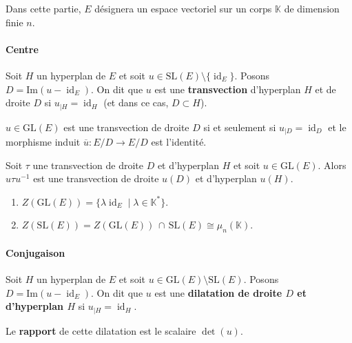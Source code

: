 	Dans cette partie, $E$ désignera un espace vectoriel sur un corps $\mathbb{K}$ de dimension finie $n$.

	\paragraph{Centre}


	\begin{definition}
		Soit $H$ un hyperplan de $E$ et soit $u \in \mathrm{SL}(E) \setminus \{ \operatorname{id}_E \}$. Posons $D = \mathrm{Im}(u - \operatorname{id}_E)$. On dit que $u$ est une \textbf{transvection} d'hyperplan $H$ et de droite $D$ si $u_{|H} = \operatorname{id}_H$ (et dans ce cas, $D \subset H$).
	\end{definition}

	\begin{proposition}
		$u \in \mathrm{GL}(E)$ est une transvection de droite $D$ si et seulement si $u_{|D} = \operatorname{id}_D$ et le morphisme induit $\overline{u} : E/D \rightarrow E/D$ est l'identité.
	\end{proposition}

	\begin{proposition}
		Soit $\tau$ une transvection de droite $D$ et d'hyperplan $H$ et soit $u \in \mathrm{GL}(E)$. Alors $u \tau u^{-1}$ est une transvection de droite $u(D)$ et d'hyperplan $u(H)$.
	\end{proposition}

	\begin{corollary}
		\begin{enumerate}[label=(\roman*)]
			\item $Z(\mathrm{GL}(E)) = \{ \lambda \operatorname{id}_E \mid \lambda \in \mathbb{K}^* \}$.
			\item $Z(\mathrm{SL}(E)) = Z(\mathrm{GL}(E)) \, \cap \, \mathrm{SL}(E) \cong \mu_n(\mathbb{K})$.
		\end{enumerate}
	\end{corollary}

	\paragraph{Conjugaison}

	\begin{definition}
		Soit $H$ un hyperplan de $E$ et soit $u \in \mathrm{GL}(E) \setminus \mathrm{SL}(E)$. Posons $D = \mathrm{Im}(u - \operatorname{id}_E)$. On dit que $u$ est une \textbf{dilatation de droite $D$ et d'hyperplan $H$} si $u_{|H} = \operatorname{id}_H$.

		\medskip
		Le \textbf{rapport} de cette dilatation est le scalaire $\det(u)$.
	\end{definition}

